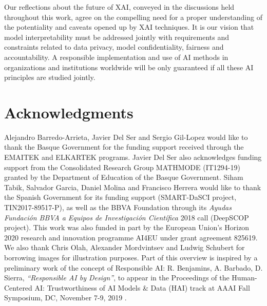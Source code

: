 \documentclass[final]{elsarticle}
\begin{document}
Our reflections about the future of XAI, conveyed in the discussions held throughout this work, agree on the compelling need for a proper understanding of the potentiality and caveats opened up by XAI techniques. It is our vision that model interpretability must be addressed jointly with requirements and constraints related to data privacy, model confidentiality, fairness and accountability. A responsible implementation and use of AI methods in organizations and institutions worldwide will be only guaranteed if all these AI principles are studied jointly.

\section*{Acknowledgments}

Alejandro Barredo-Arrieta, Javier Del Ser and Sergio Gil-Lopez would like to thank the Basque Government for the funding support received through the EMAITEK and ELKARTEK programs. {\color{black}Javier Del Ser also acknowledges funding support from the Consolidated Research Group MATHMODE (IT1294-19) granted by the Department of Education of the Basque Government}. Siham Tabik, Salvador Garcia, Daniel Molina and Francisco Herrera would like to thank the Spanish Government for its funding support (SMART-DaSCI project, TIN2017-89517-P), as well as the BBVA Foundation through its \emph{Ayudas Fundaci\'on BBVA a Equipos de Investigaci\'on Cient\'ifica} 2018 call (DeepSCOP project). {\color{black}This work was also funded in part by the European Union's Horizon 2020 research and innovation programme AI4EU under grant agreement 825619}. We also thank Chris Olah, Alexander Mordvintsev and Ludwig Schubert for borrowing images for illustration purposes. Part of this overview is inspired by a preliminary work of the concept of Responsible AI: R. Benjamins, A. Barbado, D. Sierra, \emph{``Responsible AI by Design''}, to appear in the Proceedings of the Human-Centered AI: Trustworthiness of AI Models \& Data (HAI) track at AAAI Fall Symposium, DC, November 7-9, 2019 \cite{benjamins2019responsible}. 


\end{document}
